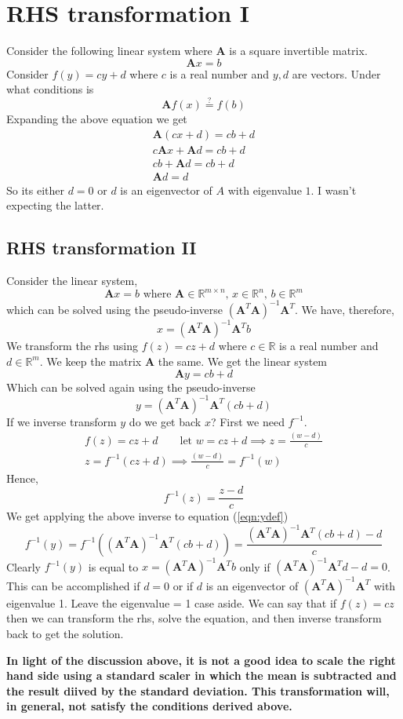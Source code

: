\documentclass{article}
\newcommand{\beq}{\begin{equation}}
\newcommand{\eeq}{\end{equation}}
\newcommand{\ber}{\begin{eqnarray}}
\newcommand{\eer}{\end{eqnarray}}
\begin{document}
\section{RHS transformation I}
Consider the following linear system where $\pmb{A}$ is a square invertible matrix.
\beq
\pmb{A}x = b
\eeq
Consider $f(y) = cy + d$ where $c$ is a real number and  $y,d$ are vectors. Under what conditions is
\beq
\pmb{A}f(x) \stackrel{?}{=} f(b)
\eeq
Expanding the above equation we get
\ber
\pmb{A}(cx+d) = cb+d\\
c\pmb{A}x + \pmb{A}d = cb + d\\
cb + \pmb{A}d= cb + d\\
\pmb{A}d = d
\eer
So its either $d=0$ or $d$ is an eigenvector of $A$ with eigenvalue $1$. I wasn't expecting the latter.

\subsection{RHS transformation II }
Consider the linear system,
\beq
\pmb{A}x = b \text{ where } \pmb{A}\in\mathbb{R}^{m\times{n}},\,x\in\mathbb{R}^n,\,b\in\mathbb{R}^m
\eeq
which can be solved using the pseudo-inverse $(\pmb{A}^{T}\pmb{A})^{-1}\pmb{A}^T$. We have, therefore,
\beq
x = (\pmb{A}^{T}\pmb{A})^{-1}\pmb{A}^Tb
\eeq
We transform the rhs using $f(z)=cz+d$ where $c\in\mathbb{R}$ is a real number and $d\in\mathbb{R}^{m}$. We keep the matrix $\pmb{A}$ the same. We get the linear system
\beq
\pmb{A}y = cb + d 
\eeq
Which can be solved again using the pseudo-inverse
\beq
\label{eqn:ydef}
y = (\pmb{A}^{T}\pmb{A})^{-1}\pmb{A}^T(cb + d)
\eeq
If we inverse transform $y$ do we get back $x$? First we need $f^{-1}$.
\ber
f(z)=cz+d \qquad \text{let } w = cz+d \implies z =\frac{(w-d)}{c}\\
z = f^{-1}(cz+d) \implies  \frac{(w-d)}{c} = f^{-1}(w)
\eer
Hence,
\beq
f^{-1}(z) = \frac{z-d}{c}
\eeq
We get applying the above inverse to equation (\ref{eqn:ydef})
\beq
f^{-1}(y) = f^{-1}((\pmb{A}^{T}\pmb{A})^{-1}\pmb{A}^T(cb + d)) = \frac{(\pmb{A}^{T}\pmb{A})^{-1}\pmb{A}^T(cb + d) -d}{c}
\eeq
Clearly $f^{-1}(y)$ is equal to $x=(\pmb{A}^{T}\pmb{A})^{-1}\pmb{A}^Tb$ only if $(\pmb{A}^{T}\pmb{A})^{-1}\pmb{A}^Td-d = 0$. This can be accomplished if $d=0$ or if $d$ is an eigenvector of $(\pmb{A}^{T}\pmb{A})^{-1}\pmb{A}^T$ with eigenvalue 1. Leave the eigenvalue = 1 case  aside. We can say that if $f(z)=cz$ then we can transform the rhs, solve the equation, and then inverse transform back to get the solution.


\textbf{In light of the discussion above, it is not a good idea to scale the right hand side using a standard scaler in which the mean is subtracted and the result diived by the standard deviation. This transformation will, in general, not satisfy the conditions derived above.}
\end{document}
